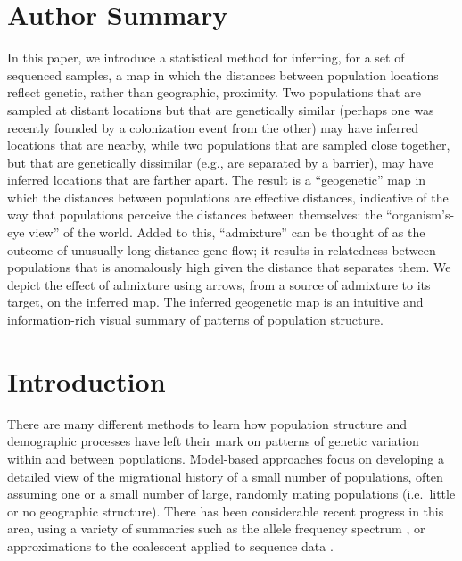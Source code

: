 \documentclass[10pt,letterpaper]{article}
\begin{document}
\section*{Author Summary}
In this paper, we introduce a statistical method for inferring, for a set of sequenced samples, 
a map in which the distances between population locations reflect genetic, rather than geographic, proximity.  
Two populations that are sampled at distant locations but that are genetically similar 
(perhaps one was recently founded by a colonization event from the other) 
may have inferred locations that are nearby, while two populations that are sampled close together, 
but that are genetically dissimilar (e.g., are separated by a barrier), may have inferred locations that are farther apart.   
The result is a ``geogenetic'' map in which the distances between populations are effective distances, 
indicative of the way that populations perceive the distances between themselves: the ``organism's-eye view'' of the world.  
Added to this, ``admixture'' can be thought of as the outcome of unusually long-distance gene flow; 
it results in relatedness between populations that is anomalously high given the distance that separates them.
We depict the effect of admixture using arrows, from a source of admixture to its target, on the inferred map.
The inferred geogenetic map is an intuitive and information-rich visual summary of patterns of population structure.
\linenumbers

\section*{Introduction}
There are many different methods to learn how population structure and demographic processes have left their mark on 
patterns of genetic variation within and between populations.
Model-based approaches focus on developing a detailed view of the migrational history of a small number of populations,
often assuming one or a small number of large, randomly mating populations (i.e.\ little or no geographic structure).
There has been considerable recent progress in this area, using a variety of summaries such as the allele frequency spectrum \cite{dadi, Bhaskar2014, Excoffier2013}, 
or approximations to the coalescent applied to sequence data \cite{Paul_Song2011, Li_Durbin2011, Schiffels_Durbin_2014}.
\end{document}
